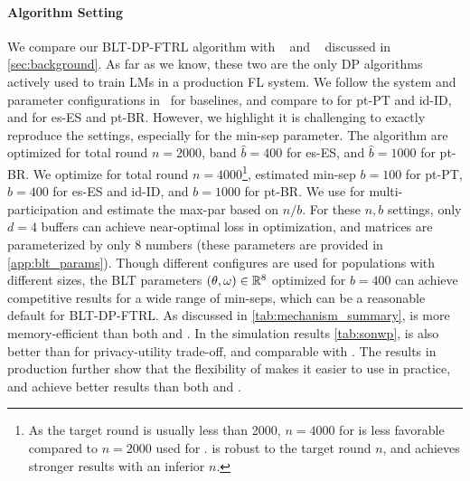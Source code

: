 \paragraph{Algorithm Setting} We compare our BLT-DP-FTRL algorithm with \treeagg~\citep{kairouz21practical,xu2023federated} and \bandmf~\citep{choquette2023amplified} discussed in \cref{sec:background}. As far as we know, these two are the only DP algorithms actively used to train LMs in a production FL system. We follow the system and parameter configurations in~\citep{xu2023federated,choquette2023amplified,gboard_dp_blogpost} for baselines, and compare to \treeagg for pt-PT and id-ID, and \bandmf for es-ES and pt-BR. However, we highlight it is challenging to exactly reproduce the settings, especially for the min-sep parameter. The \bandmf algorithm are optimized for total round $n=2000$, band $\hat b = 400$ for es-ES, and $\hat b = 1000$ for pt-BR. We optimize \blt for total round $n=4000$\footnote{As the target round is usually less than 2000, $n=4000$ for \blt is less favorable compared to $n=2000$ used for \bandmf. \blt is robust to the target round $n$, and achieves stronger results with an inferior $n$.}, estimated min-sep $b=100$ for pt-PT, $b=400$ for es-ES and id-ID, and $b=1000$ for pt-BR. We use \ourblt for multi-participation and estimate the max-par based on $n/b$. For these $n,b$ settings, only $d=4$ buffers can achieve near-optimal loss in optimization, and \ourblt matrices are parameterized by only 8 numbers (these parameters are provided in \cref{app:blt_params}). Though different configures are used for populations with different sizes, the BLT parameters $(\theta, \omega) \in \mathbb{R}^8$ optimized for $b=400$ can achieve competitive results for a wide range of min-seps, which can be a reasonable default for BLT-DP-FTRL. As discussed in \cref{tab:mechanism_summary}, \blt is more memory-efficient than both \treeagg and \bandmf. In the simulation results \cref{tab:sonwp}, \blt is also better than \treeagg for privacy-utility trade-off, and comparable with \bandmf. The results in production further show that the flexibility of \blt makes it easier to use in practice, and achieve better results than both \treeagg and \bandmf.
